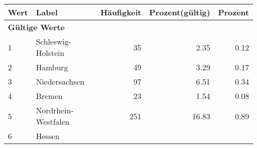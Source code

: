      \begin{longtable}{lXrrr}
     \toprule
     \textbf{Wert} & \textbf{Label} & \textbf{Häufigkeit} & \textbf{Prozent(gültig)} & \textbf{Prozent} \\
     \endhead
     \midrule
     \multicolumn{5}{l}{\textbf{Gültige Werte}}\\

     1 &
     \multicolumn{1}{X}{ Schleswig-Holstein   } &


       \num{35} &
       \num[round-mode=places,round-precision=2]{2.35} &
         \num[round-mode=places,round-precision=2]{0.12} \\

     2 &
     \multicolumn{1}{X}{ Hamburg   } &


       \num{49} &
       \num[round-mode=places,round-precision=2]{3.29} &
         \num[round-mode=places,round-precision=2]{0.17} \\

     3 &
     \multicolumn{1}{X}{ Niedersachsen   } &


       \num{97} &
       \num[round-mode=places,round-precision=2]{6.51} &
         \num[round-mode=places,round-precision=2]{0.34} \\

     4 &
     \multicolumn{1}{X}{ Bremen   } &


       \num{23} &
       \num[round-mode=places,round-precision=2]{1.54} &
         \num[round-mode=places,round-precision=2]{0.08} \\

     5 &
     \multicolumn{1}{X}{ Nordrhein-Westfalen   } &


       \num{251} &
       \num[round-mode=places,round-precision=2]{16.83} &
         \num[round-mode=places,round-precision=2]{0.89} \\

     6 &
     \multicolumn{1}{X}{ Hessen   } &



\end{longtable}
